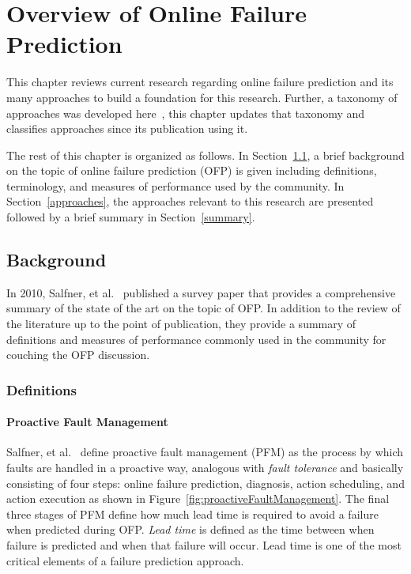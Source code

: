 \chapter{Overview of Online Failure Prediction} \label{chapter2}
This chapter reviews current research regarding online failure prediction and
its many approaches to build a foundation for this research.  Further, a
taxonomy of approaches was developed here~\cite{salfnerSurvey}, this chapter
updates that taxonomy and classifies approaches since its publication using it.

The rest of this chapter is organized as follows.  In Section~\ref{background},
a brief background on the topic of online failure prediction (OFP) is given
including definitions, terminology, and measures of performance used by the
community.  In Section~\ref{approaches}, the approaches relevant to this
research are presented followed by a brief summary in Section~\ref{summary}.

\section{Background} \label{background}
In 2010, Salfner, et al.~\cite{salfnerSurvey} published a survey paper that
provides a comprehensive summary of the state of the art on the topic of OFP.
In addition to the review of the literature up to the point of publication,
they provide a summary of definitions and measures of performance commonly used
in the community for couching the OFP discussion.

\subsection{Definitions} \label{definitions}
\subsubsection{Proactive Fault Management} \label{pfm}
Salfner, et al.~\cite{salfnerSurvey} define proactive fault management (PFM) as
the process by which faults are handled in a proactive way, analogous with
\emph{fault tolerance} and basically consisting of four steps: online failure
prediction, diagnosis, action scheduling, and action execution as shown in
Figure~\ref{fig:proactiveFaultManagement}.
The final three stages of PFM define how much lead time is required to avoid a
failure when predicted during OFP.  \emph{Lead time} is defined as the time
between when failure is predicted and when that failure will occur.  Lead time
is one of the most critical elements of a failure prediction approach.


